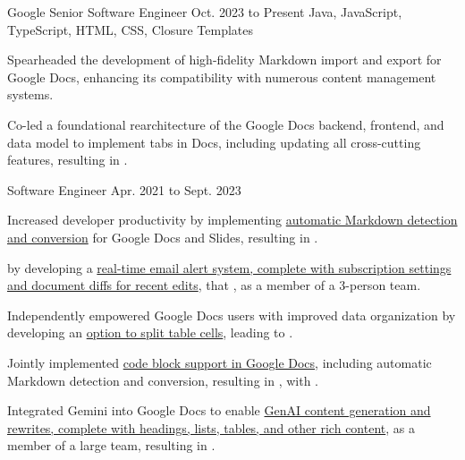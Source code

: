 
\begin{cventry}
    {Google}
    {Senior Software Engineer}
    {Oct. 2023 to Present}
    {Java, JavaScript, TypeScript, HTML, CSS, Closure Templates}
    \begin{cvitems}
        \item Spearheaded the development of high-fidelity Markdown import and export for Google Docs, enhancing its compatibility with numerous content management systems.
        \item Co-led a foundational rearchitecture of the Google Docs backend, frontend, and data model to implement tabs in Docs, including updating all cross-cutting features, resulting in .
    \end{cvitems}
\end{cventry}

\begin{cventry}
    {}
    {Software Engineer}
    {Apr. 2021 to Sept. 2023}{}
    \begin{cvitems}
        \item Increased developer productivity by implementing \href{https://workspaceupdates.googleblog.com/2022/03/compose-with-markdown-in-google-docs-on.html}{automatic Markdown detection and conversion} for Google Docs and Slides, resulting in .
        \item {} by developing a \href{https://workspaceupdates.googleblog.com/2022/07/edit-notifications-for-document-content-changes.html}{real-time email alert system, complete with subscription settings and document diffs for recent edits}, that , as a member of a 3-person team.
        \item Independently empowered Google Docs users with improved data organization by developing an \href{https://workspaceupdates.googleblog.com/2022/10/split-table-cells-in-google-docs.html}{option to split table cells}, leading to .
        \item Jointly implemented \href{https://workspaceupdates.googleblog.com/2022/12/format-display-code-google-docs.html}{code block support in Google Docs}, including automatic Markdown detection and conversion, resulting in , with .
        \item Integrated Gemini into Google Docs to enable \href{https://workspace.google.com/blog/product-announcements/generative-ai}{GenAI content generation and rewrites, complete with headings, lists, tables, and other rich content}, as a member of a large team, resulting in .
    \end{cvitems}
\end{cventry}


